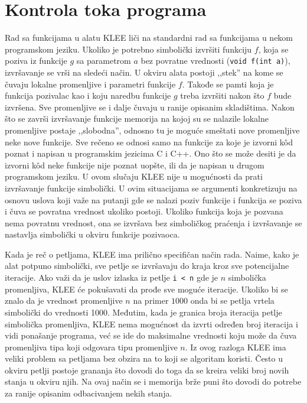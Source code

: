 \documentclass[12pt,oneside]{memoir}
\begin{document}
\section{Kontrola toka programa}
Rad sa funkcijama u alatu KLEE liči na standardni rad sa funkcijama u nekom programskom jeziku. Ukoliko je potrebno simbolički izvršiti funkciju $f$, koja se poziva iz funkcije $g$ sa parametrom $a$ bez povratne vrednosti (\texttt{void f(int a)}), izvršavanje se vrši na sledeći način. U okviru alata postoji ,,stek'' na kome se čuvaju lokalne promenljive i parametri funkcije $f$. Takođe se pamti koja je funkcija pozivalac kao i koju naredbu funkcije $g$ treba izvršiti nakon što $f$ bude izvršena. Sve promenljive se i dalje čuvaju u ranije opisanim skladištima. Nakon što se završi izvršavanje funkcije memorija na kojoj su se nalazile lokalne promenljive postaje ,,slobodna'', odnosno tu je moguće smeštati nove promenljive neke nove funkcije. Sve rečeno se odnosi samo na funkcije za koje je izvorni k\^od poznat i napisan u programskim jezicima C i C++. Ono što se može desiti je da izvorni k\^od neke funkcije nije poznat uopšte, ili da je napisan u drugom programskom jeziku. U ovom slučaju KLEE nije u mogućnosti da prati izvršavanje funkcije simbolički. U ovim situacijama se argumenti konkretizuju na osnovu uslova koji važe na putanji gde se nalazi poziv funkcije i funkcija se poziva i čuva se povratna vrednost ukoliko postoji. Ukoliko funkcija koja je pozvana nema povratnu vrednost, ona se izvršava bez simboličkog praćenja i izvršavanje se nastavlja simbolički u okviru funkcije pozivaoca. 

\indent Kada je reč o petljama, KLEE ima prilično specifičan način rada. Naime, kako je alat potpuno simbolički, sve petlje se izvršavaju do kraja kroz sve potencijalne iteracije. Ako važi da je uslov izlaska iz petlje \texttt{i < n} gde je $n$ simbolička promenljiva, KLEE će pokušavati da prođe sve moguće iteracije. Ukoliko bi se znalo da je vrednost promenljive $n$ na primer $1000$ onda bi se petlja vrtela simbolički do vrednosti 1000. Međutim, kada je granica broja iteracija petlje simbolička promenljiva, KLEE nema mogućnost da izvrti određen broj iteracija i vidi ponašanje programa, već se ide do maksimalne vrednosti koju može da čuva promenljiva tipa koji odgovara tipu promenljive $n$. Iz ovog razloga KLEE ima veliki problem sa petljama bez obzira na to koji se algoritam koristi. Često u okviru petlji postoje grananja što dovodi do toga da se kreira veliki broj novih stanja u okviru njih. Na ovaj način se i memorija brže puni što dovodi do potrebe za ranije opisanim odbacivanjem nekih stanja. 
\end{document}
